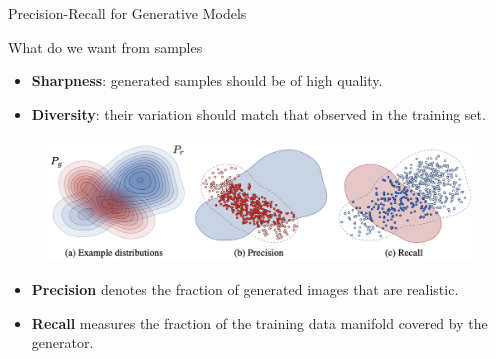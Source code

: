 \begin{frame}{Precision-Recall for Generative Models}
	\begin{block}{What do we want from samples}
		\begin{itemize}
			\item \textbf{Sharpness}: generated samples should be of high quality.
			\item \textbf{Diversity}: their variation should match that observed in the training set.
		\end{itemize}
	\end{block}
	\vspace{-0.5cm}
	\begin{figure}
		\includegraphics[width=0.95\linewidth]{figs/pr_curve}
	\end{figure}
	\vspace{-0.3cm}
	\begin{itemize}
		\item \textbf{Precision} denotes the fraction of generated images that are realistic.
		\item \textbf{Recall} measures the fraction of the training data manifold covered by the generator.
	\end{itemize}
\end{frame}
